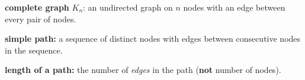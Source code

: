 \documentclass{article}
\begin{document}
\textbf{complete graph} $K_n$: an undirected graph on $n$ nodes with an edge between every pair of nodes.
\vspace{5pt}

\textbf{simple path:} a sequence of distinct nodes with edges between consecutive nodes in the sequence.
\vspace{5pt}

\textbf{length of a path:} the number of \textit{edges} in the path (\textbf{not} number of nodes).
\vspace{5pt}


\vspace{15pt}


\vspace{5pt}

\vspace{15pt}




\vspace{15pt}

\vspace{15pt}


\begin{adjustwidth}{-1cm}{}
	\begin{sloppypar}
		\begin{tabular}{l l l l}
									   
		\end{tabular}
	\end{sloppypar}
	


\end{adjustwidth}
\end{document}
